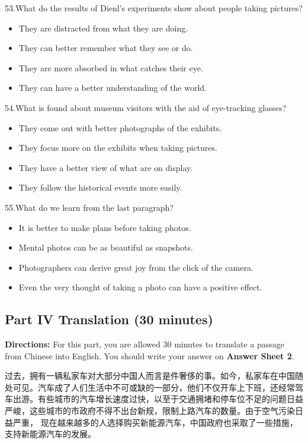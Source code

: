 \documentclass[UTF8,11pt]{ctexart}
\begin{document}
53.What do the results of Dienl’s experiments show about people taking pictures?


\begin{itemize}[leftmargin=2em,itemsep=.2em,topsep=.4em]\item[A.] They are distracted from what they are doing.
\item[B.] They can better remember what they see or do.
\item[C.] They are more absorbed in what catches their eye.
\item[D.] They can have a better understanding of the world.
\end{itemize}

54.What is found about museum visitors with the aid of eye-tracking glasses?


\begin{itemize}[leftmargin=2em,itemsep=.2em,topsep=.4em]\item[A.] They come out with better photographs of the exhibits.
\item[B.] They focus more on the exhibits when taking pictures.
\item[C.] They have a better view of what are on display.
\item[D.] They follow the historical events more easily.
\end{itemize}

55.What do we learn from the last paragraph?


\begin{itemize}[leftmargin=2em,itemsep=.2em,topsep=.4em]\item[A.] It is better to make plans before taking photos.
\item[B.] Mental photos can be as beautiful as snapshots.
\item[C.] Photographers can derive great joy from the click of the camera.
\item[D.] Even the very thought of taking a photo can have a positive effect.
\end{itemize}

\subsection*{\textbf{Part IV} \textbf{Translation} \textbf{(30 minutes)}}


\textbf{Directions:} For this part, you are allowed 30 minutes to translate a passage from Chinese into English. You should write your answer on\textbf{ Answer Sheet 2}.


过去，拥有一辆私家车对大部分中国人而言是件奢侈的事。如今，私家车在中国随处可见。汽车成了人们生活中不可或缺的一部分，他们不仅开车上下班，还经常驾车出游。有些城市的汽车增长速度过快，以至于交通拥堵和停车位不足的问题日益严峻，这些城市的市政府不得不出台新规，限制上路汽车的数量。由于空气污染日益严重， 现在越来越多的人选择购买新能源汽车，中国政府也采取了一些措施，支持新能源汽车的发展。
\end{document}
